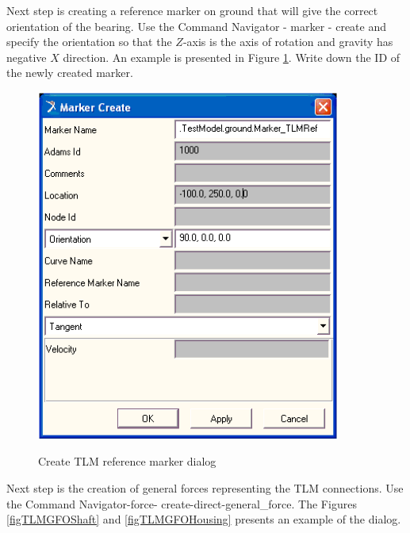 Next step is creating a reference marker on ground that
will give the correct orientation of the bearing.
Use the Command Navigator - marker - create and
specify the orientation so that the $Z$-axis is the
axis of rotation and gravity has negative $X$ direction.
An example is presented in Figure \ref{figTLMRefMarker}.
Write down the ID of the newly created marker.

\begin{figure}[h]
\begin{center}
   {\includegraphics[width=10cm]{figs/TLMRefMarker.png}}
\end{center}
\caption{Create TLM reference marker dialog \label{figTLMRefMarker}}
\end{figure}
Next step is the creation of general forces representing
the TLM connections. Use the Command Navigator-force-
create-direct-general\_force. The Figures \ref{figTLMGFOShaft}
 and \ref{figTLMGFOHousing} presents an example of the dialog.

